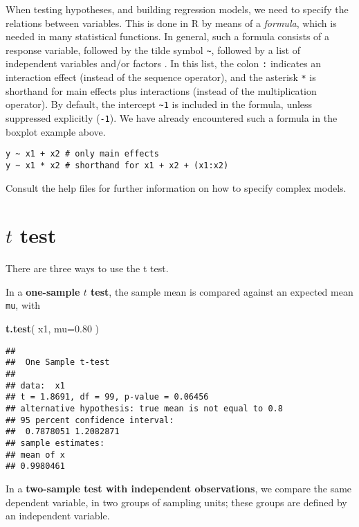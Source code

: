 \documentclass[]{book}
\newenvironment{Shaded}{\begin{snugshade}}{\end{snugshade}}
\newcommand{\DataTypeTok}[1]{\textcolor[rgb]{0.13,0.29,0.53}{#1}}
\newcommand{\FloatTok}[1]{\textcolor[rgb]{0.00,0.00,0.81}{#1}}
\newcommand{\KeywordTok}[1]{\textcolor[rgb]{0.13,0.29,0.53}{\textbf{#1}}}
\newcommand{\NormalTok}[1]{#1}
\begin{document}
When testing hypotheses, and building regression models, we need to
specify the relations between variables. This is done in
R by means of a \emph{formula}, which is needed in many
statistical functions. In general, such a formula consists of a
response variable, followed by the tilde symbol
{\texttt{\textasciitilde{}}}, followed by a list of independent
variables and/or factors \citep{wilk73}.
In this list, the colon
\texttt{:} indicates an interaction effect (instead
of the sequence operator), and the asterisk
\texttt{*} is shorthand for main effects plus
interactions (instead of the multiplication operator).
By default,
the intercept \texttt{\textasciitilde{}1} is included in the
formula, unless suppressed explicitly
(\texttt{-1}). We have already encountered such a formula
in the boxplot example above.

\begin{verbatim}
y ~ x1 + x2 # only main effects 
y ~ x1 * x2 # shorthand for x1 + x2 + (x1:x2) 
\end{verbatim}

Consult the help files for further information on how to specify
complex models.

\hypertarget{t-test}{%
\section{\texorpdfstring{\(t\) test}{t test}}\label{t-test}}

There are three ways to use the t test.

In a \textbf{one-sample \(t\) test}, the sample mean is compared against an expected mean \texttt{mu},
with

\begin{Shaded}
\begin{Highlighting}[]
\KeywordTok{t.test}\NormalTok{( x1, }\DataTypeTok{mu=}\FloatTok{0.80}\NormalTok{ )}
\end{Highlighting}
\end{Shaded}

\begin{verbatim}
## 
##  One Sample t-test
## 
## data:  x1
## t = 1.8691, df = 99, p-value = 0.06456
## alternative hypothesis: true mean is not equal to 0.8
## 95 percent confidence interval:
##  0.7878051 1.2082871
## sample estimates:
## mean of x 
## 0.9980461
\end{verbatim}

In a \textbf{two-sample test with independent observations}, we compare
the same dependent variable, in two groups of sampling units; these groups are defined by an independent variable.
\end{document}
